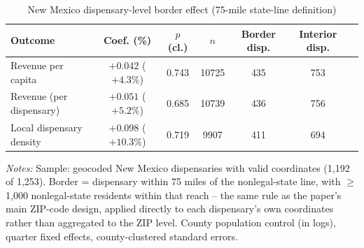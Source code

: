 \begin{table}[htbp]
\centering
\caption{New Mexico dispensary-level border effect (75-mile state-line definition)}
\label{tab:nm_dispensary_border_main}
\footnotesize
\begin{tabular}{lcccccc}
\toprule
Outcome & Coef. (\%) & $p$ (cl.) & $n$ & Border disp. & Interior disp. \\
\midrule
Revenue per capita & $+0.042$ ($+4.3\%$) & 0.743 & 10725 & 435 & 753 \\
Revenue (per dispensary) & $+0.051$ ($+5.2\%$) & 0.685 & 10739 & 436 & 756 \\
Local dispensary density & $+0.098$ ($+10.3\%$) & 0.719 & 9907 & 411 & 694 \\
\bottomrule
\end{tabular}
\begin{minipage}{0.95\textwidth}
\vspace{0.3em}
\footnotesize
\textit{Notes:} Sample: geocoded New Mexico dispensaries with valid coordinates (1,192 of 1,253).
Border = dispensary within 75 miles of the nonlegal-state line, with $\geq$1,000 nonlegal-state
residents within that reach -- the same rule as the paper's main ZIP-code design, applied directly
to each dispensary's own coordinates rather than aggregated to the ZIP level. County population
control (in logs), quarter fixed effects, county-clustered standard errors.
\end{minipage}
\end{table}
